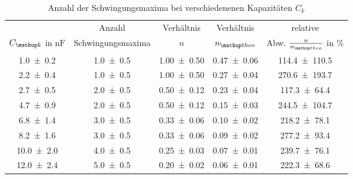 \begin{table}
\centering
\caption{Anzahl der Schwingungsmaxima bei verschiedenenen Kapazitäten $C_k$}
\label{tab:teila_n_ck}
\begin{tabular}{S S S S S } 
\toprule
{} & {Anzahl} & {Verhältnis} & { Verhältnis } & {relative }  \\
{$C\ua{k}$ in $\si{\nano\farad}$} & {Schwingungsmaxima} & {$n$ } & {$n\ua{theo}$} & {Abw. $\frac{n}{n\ua{theo}}$ in \%} \\
\midrule
 \num{1.0\pm0.2} & \num{1.0\pm0.5} & \num{1.00\pm0.50} & \num{0.47\pm0.06} & \num{114.4\pm110.5}\\
\num{2.2\pm0.4} & \num{1.0\pm0.5} & \num{1.00\pm0.50} & \num{0.27\pm0.04} & \num{270.6\pm193.7}\\
\num{2.7\pm0.5} & \num{2.0\pm0.5} & \num{0.50\pm0.12} & \num{0.23\pm0.04} & \num{117.3\pm64.4}\\
\num{4.7\pm0.9} & \num{2.0\pm0.5} & \num{0.50\pm0.12} & \num{0.15\pm0.03} & \num{244.5\pm104.7}\\
\num{6.8\pm1.4} & \num{3.0\pm0.5} & \num{0.33\pm0.06} & \num{0.10\pm0.02} & \num{218.2\pm78.1}\\
\num{8.2\pm1.6} & \num{3.0\pm0.5} & \num{0.33\pm0.06} & \num{0.09\pm0.02} & \num{277.2\pm93.4}\\
\num{10.0\pm2.0} & \num{4.0\pm0.5} & \num{0.25\pm0.03} & \num{0.07\pm0.01} & \num{239.7\pm76.1}\\
\num{12.0\pm2.4} & \num{5.0\pm0.5} & \num{0.20\pm0.02} & \num{0.06\pm0.01} & \num{222.3\pm68.6}\\
\bottomrule
\end{tabular}
\end{table}
